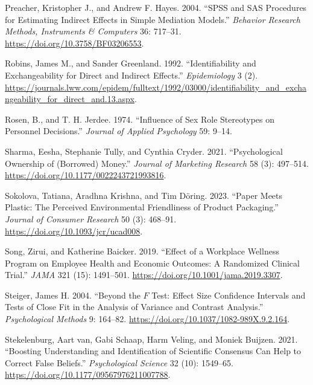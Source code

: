 \documentclass[
  11pt,
  letterpaper,
]{scrbook}
\newlength{\cslhangindent}
\newenvironment{CSLReferences}[2] %
 {\begin{list}{}{%
  \setlength{\itemindent}{0pt}
  \setlength{\leftmargin}{0pt}
  \setlength{\parsep}{0pt}
  \ifodd #1
   \setlength{\leftmargin}{\cslhangindent}
   \setlength{\itemindent}{-1\cslhangindent}
  \fi
  \setlength{\itemsep}{#2\baselineskip}}}
 {\end{list}}
\theoremstyle{definition}
\theoremstyle{definition}
\theoremstyle{remark}
\begin{document}
\begin{CSLReferences}{1}{0}
Preacher, Kristopher J., and Andrew F. Hayes. 2004. {``{SPSS} and {SAS}
Procedures for Estimating Indirect Effects in Simple Mediation
Models.''} \emph{Behavior Research Methods, Instruments {\&} Computers}
36: 717--31. \url{https://doi.org/10.3758/BF03206553}.

Robins, James M., and Sander Greenland. 1992. {``Identifiability and
Exchangeability for Direct and Indirect Effects.''} \emph{Epidemiology}
3 (2).
\url{https://journals.lww.com/epidem/fulltext/1992/03000/identifiability_and_exchangeability_for_direct_and.13.aspx}.

Rosen, B., and T. H. Jerdee. 1974. {``Influence of Sex Role Stereotypes
on Personnel Decisions.''} \emph{Journal of Applied Psychology} 59:
9--14.

Sharma, Eesha, Stephanie Tully, and Cynthia Cryder. 2021.
{``Psychological Ownership of (Borrowed) Money.''} \emph{Journal of
Marketing Research} 58 (3): 497--514.
\url{https://doi.org/10.1177/0022243721993816}.

Sokolova, Tatiana, Aradhna Krishna, and Tim Döring. 2023. {``Paper Meets
Plastic: The Perceived Environmental Friendliness of Product
Packaging.''} \emph{Journal of Consumer Research} 50 (3): 468--91.
\url{https://doi.org/10.1093/jcr/ucad008}.

Song, Zirui, and Katherine Baicker. 2019. {``Effect of a Workplace
Wellness Program on Employee Health and Economic Outcomes: A Randomized
Clinical Trial.''} \emph{JAMA} 321 (15): 1491--501.
\url{https://doi.org/10.1001/jama.2019.3307}.

Steiger, James H. 2004. {``Beyond the \(F\) Test: Effect Size Confidence
Intervals and Tests of Close Fit in the Analysis of Variance and
Contrast Analysis.''} \emph{Psychological Methods} 9: 164--82.
\url{https://doi.org/10.1037/1082-989X.9.2.164}.

Stekelenburg, Aart van, Gabi Schaap, Harm Veling, and Moniek Buijzen.
2021. {``Boosting Understanding and Identification of Scientific
Consensus Can Help to Correct False Beliefs.''} \emph{Psychological
Science} 32 (10): 1549--65.
\url{https://doi.org/10.1177/09567976211007788}.


\end{CSLReferences}
\end{document}
